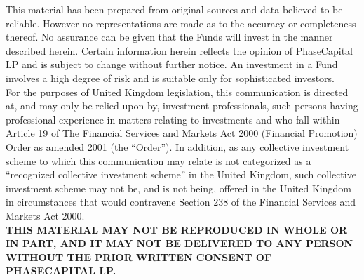 \documentclass[9pt]{article}
\begin{document}
This material has been prepared from original sources and data
believed to be reliable.  However no representations are made as to the
accuracy or completeness thereof.  No assurance can be given that the Funds
will invest in the manner described herein.  Certain information herein
reflects the opinion of PhaseCapital LP and is subject to change without
further notice.  An investment in a Fund involves a high degree of risk and is
suitable only for sophisticated investors. \\

For the purposes of United Kingdom legislation, this communication is
directed at, and may only be relied upon by, investment professionals, such
persons having professional experience in matters relating to investments and
who fall within Article 19 of The Financial Services and Markets Act 2000
(Financial Promotion) Order as amended 2001 (the ``Order'').  In addition, as
any collective investment scheme to which this communication may relate is not
categorized as a ``recognized collective investment scheme'' in the United
Kingdom, such collective investment scheme may not be, and is not being,
offered in the United Kingdom in circumstances that would contravene Section
238 of the Financial Services and Markets Act 2000. \\

\textbf{THIS MATERIAL MAY NOT BE REPRODUCED IN WHOLE OR IN PART, AND IT MAY
NOT BE DELIVERED TO ANY PERSON WITHOUT THE PRIOR WRITTEN CONSENT OF
PHASECAPITAL LP.}
\end{document}
